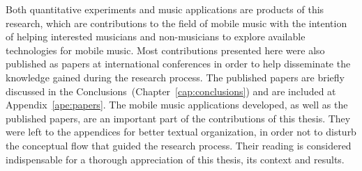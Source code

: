 Both quantitative experiments and music applications are products of this research, which are contributions to the field of mobile music with the intention of helping interested musicians and non-musicians to explore available technologies for mobile music.
Most contributions presented here were also published as papers at international conferences in order to help disseminate the knowledge gained during the research process.
The published papers are briefly discussed in the Conclusions~(Chapter~\ref{cap:conclusions}) and are included at Appendix~\ref{ape:papers}.
The mobile music applications developed, as well as the published papers, are an important part of the contributions of this thesis. They were left to the appendices for better textual organization, in order not to disturb the conceptual flow that guided the research process. Their reading is considered indispensable for a thorough appreciation of this thesis, its context and results.